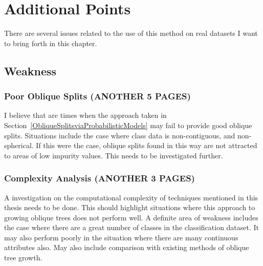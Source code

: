 \chapter{Additional Points}
\label{AdditionalPoints}
There are several issues related to the use of this method on real datasets I want to bring forth in this chapter. %

\section{Weakness}
\label{Weakness}
\subsection{Poor Oblique Splits (ANOTHER 5 PAGES)}
\label{PoorObliqueSplits}
I believe that are times when the approach taken in Section~\ref{ObliqueSplitsviaProbabilisticModels} may fail to provide good oblique splits. Situations include the case where class data is non-contiguous, and non-spherical. If this were the case, oblique splits found in this way are not attracted to areas of low impurity values. This needs to be investigated further.\\

\subsection{Complexity Analysis (ANOTHER 3 PAGES)}
\label{ComplexityAnalysis}
A investigation on the computational complexity of techniques mentioned in this thesis needs to be done. This should highlight situations where this approach to growing oblique trees does not perform well. A definite area of weakness includes the case where there are a great number of classes in the classification dataset. It may also perform poorly in the situation where there are many continuous attributes also. May also include comparison with existing methods of oblique tree growth.\\

\begin{comment}
\section{Strengths}
\label{Strengths}
\subsection{Rotational Invariance (ANOTHER 2 PAGES)}
\label{Rotational Invariance}
By allowing oblique splits, oblique trees are invariant to rotations in the dataset unlike axis-parallel trees. It would be useful to demonstrate this by rotating a dataset and growing axis-parallel and oblique trees on them to show this invariance.\\
\end{comment}
